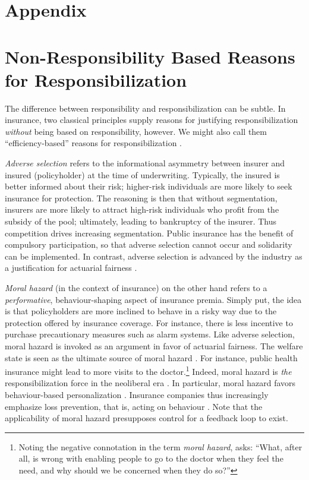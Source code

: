 \documentclass[11pt]{article} %
\begin{document}





\appendix
\section{Appendix}
\section{Non-Responsibility Based Reasons for Responsibilization}
\label{sec:moralhazardadverse}
 The difference between responsibility and responsibilization can be subtle. In insurance, two classical principles supply reasons for justifying responsibilization \textit{without} being based on responsibility, however. We might also call them ``efficiency-based'' reasons for responsibilization \citep{andersen2015luck}.

\textit{Adverse selection} \citep{george1970market,thiery2006fairness,avraham2013understanding} refers to the informational asymmetry between insurer and insured (policyholder) at the time of underwriting. Typically, the insured is better informed about their risk; higher-risk individuals are more likely to seek insurance for protection. The reasoning is then that without segmentation, insurers are more likely to attract high-risk individuals who profit from the subsidy of the pool; ultimately, leading to bankruptcy of the insurer. Thus competition drives increasing segmentation. Public insurance has the benefit of compulsory participation, so that adverse selection cannot occur and solidarity can be implemented. In contrast, adverse selection is advanced by the industry as a justification for actuarial fairness \citep{miller2009disparate}.

\textit{Moral hazard} \citep{heimer1985reactive,baker1996genealogy,baker2000insuring} (in the context of insurance) on the other hand refers to a \textit{performative}, behaviour-shaping aspect of insurance premia. Simply put, the idea is that policyholders are more inclined to behave in a risky way due to the protection offered by insurance coverage. For instance, there is less incentive to purchase precautionary measures such as alarm systems.
Like adverse selection, moral hazard is invoked as an argument in favor of actuarial fairness. The welfare state is seen as the ultimate source of moral hazard \citep{ericson2000moral}. For instance, public health insurance might lead to more visits to the doctor.\footnote{Noting the negative connotation in the term \textit{moral hazard}, \citet{baker1996genealogy} asks: ``What, after all, is wrong
with enabling people to go to the doctor when they feel the need, and why
should we be concerned when they do so?''}
Indeed, moral hazard is \textit{the} responsibilization force in the neoliberal era \citep{ericson2000moral}. In particular, moral hazard favors behaviour-based personalization \citep{verbelen2018unravelling}. Insurance companies thus increasingly emphasize loss prevention, that is, acting on behaviour \citep{baker2002embracing,cevolini2022actuarial}.
Note that the applicability of moral hazard presupposes control for a feedback loop to exist.
\end{document}

